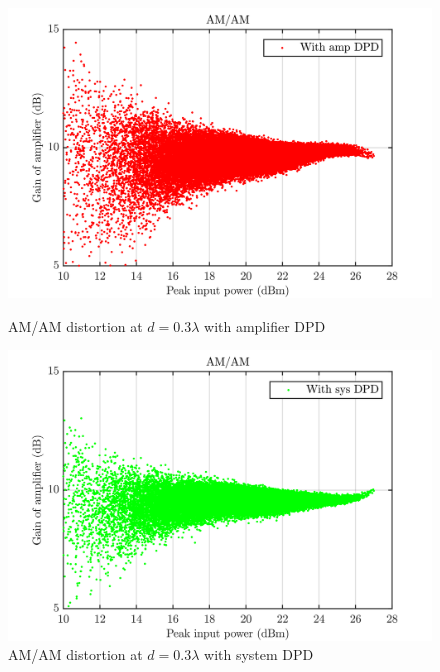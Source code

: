 \begin{figure}[H]
  \centering
  \begin{minipage}[b]{0.5\textwidth}
	\includegraphics[scale = 0.5]{figures/measurement/cree/meas3/amam_amp_dpd_0p3.png}
	\caption{AM/AM distortion at $d = 0.3\lambda$ with amplifier DPD}	
    \label{fig:meas3_amam5}
  \end{minipage}
  \hfill
  \begin{minipage}[b]{0.4\textwidth}
	\includegraphics[scale = 0.5]{figures/measurement/cree/meas3/amam_sys_dpd_0p3.png}
	\caption{AM/AM distortion at $d = 0.3\lambda$ with system DPD}
    \label{fig:meas3_amam6}
  \end{minipage}
\end{figure}

